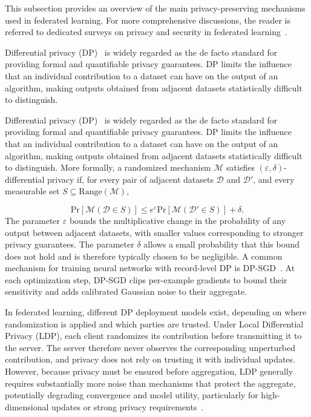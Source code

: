 This subsection provides an overview of the main privacy-preserving mechanisms used in federated learning. For more comprehensive discussions, the reader is referred to dedicated surveys on privacy and security in federated learning~\cite{Rao_privacy_survey, Yin_defense_taxonomy, sok_secure_aggregation}.

Differential privacy (DP)~\cite{dp_dwork,dwork_dp_book} is widely regarded as the de facto standard for providing formal and quantifiable privacy guarantees. DP limits the influence that an individual contribution to a dataset can have on the output of an algorithm, making outputs obtained from adjacent datasets statistically difficult to distinguish.

Differential privacy (DP)~\cite{dp_dwork,dwork_dp_book} is widely regarded as the de facto standard for providing formal and quantifiable privacy guarantees. DP limits the influence that an individual contribution to a dataset can have on the output of an algorithm, making outputs obtained from adjacent datasets statistically difficult to distinguish. More formally, a randomized mechanism $\mathcal{M}$ satisfies $(\varepsilon,\delta)$-differential privacy if, for every pair of adjacent datasets $\mathcal{D}$ and $\mathcal{D}'$, and every measurable set $S \subseteq \mathrm{Range}(\mathcal{M})$,

\begin{equation}\label{eq:dp}
    \mathrm{Pr}\left[ \mathcal{M}(\mathcal{D} \in S)\right] \leq e^{\varepsilon} \mathrm{Pr}\left[ \mathcal{M}(\mathcal{D}' \in S)\right] + \delta.
\end{equation}
The parameter $\varepsilon$ bounds the multiplicative change in the probability of any output between adjacent datasets, with smaller values corresponding to stronger privacy guarantees. The parameter $\delta$ allows a small probability that this bound does not hold and is therefore typically chosen to be negligible. A common mechanism for training neural networks with record-level DP is DP-SGD~\cite{Abadi_dp}. At each optimization step, DP-SGD clips per-example gradients to bound their sensitivity and adds calibrated Gaussian noise to their aggregate.

In federated learning, different DP deployment models exist, depending on where randomization is applied and which parties are trusted. Under Local Differential Privacy (LDP), each client randomizes its contribution before transmitting it to the server. The server therefore never observes the corresponding unperturbed contribution, and privacy does not rely on trusting it with individual updates. However, because privacy must be ensured before aggregation, LDP generally requires substantially more noise than mechanisms that protect the aggregate, potentially degrading convergence and model utility, particularly for high-dimensional updates or strong privacy requirements~\cite{geyer2018differentiallyprivatefederatedlearning,kairouz_open_problems}.

